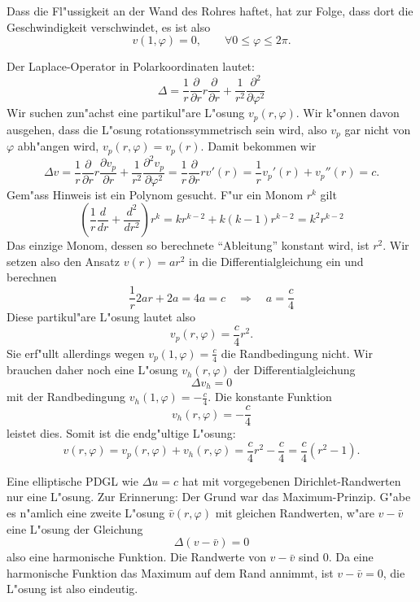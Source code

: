 \begin{loesung}
\begin{teilaufgaben}
\item Dass die Fl"ussigkeit an der Wand des Rohres haftet, hat zur
Folge, dass dort die Geschwindigkeit verschwindet, es ist also
\[
v(1,\varphi)=0,\qquad\forall 0\le \varphi\le 2\pi.
\]
\item Der Laplace-Operator in Polarkoordinaten lautet:
\[
\Delta
=
\frac1r\frac{\partial}{\partial r}r\frac{\partial}{\partial r}
+\frac1{r^2}\frac{\partial^2}{\partial\varphi^2}
\]
Wir suchen zun"achst eine partikul"are L"osung $v_p(r,\varphi)$.
Wir k"onnen davon ausgehen, dass die L"osung rotationssymmetrisch
sein wird, also $v_p$ gar nicht von $\varphi$ abh"angen wird,
$v_p(r,\varphi)=v_p(r)$. Damit bekommen wir
\[
\Delta v=
\frac1r\frac{\partial}{\partial r}r
\frac{\partial v_p}{\partial r}
+\frac1{r^2}\frac{\partial^2v_p}{\partial\varphi^2}
=
\frac1r\frac{\partial}{\partial r}rv'(r)
=
\frac1rv_p'(r)+v_p''(r)=c.
\]
Gem"ass Hinweis ist ein Polynom gesucht. F"ur ein Monom $r^k$
gilt
\[
\left(\frac1r\frac{d}{dr}+\frac{d^2}{dr^2}\right)r^k
=kr^{k-2}+k(k-1)r^{k-2}
=k^2 r^{k-2}
\]
Das einzige Monom, dessen so berechnete ``Ableitung'' konstant wird, ist
$r^2$.
Wir
setzen also den Ansatz $v(r)=ar^2$
in die Differentialgleichung ein und berechnen
\[
\frac1r2ar+2a
=
4a
=c
\quad
\Rightarrow
\quad
a=\frac{c}{4}
\]
Diese partikul"are L"osung lautet also
\[
v_p(r,\varphi)=\frac{c}{4}r^2.
\]
Sie erf"ullt allerdings wegen $v_p(1,\varphi)=\frac{c}{4}$ die
Randbedingung nicht. Wir brauchen daher noch eine
L"osung $v_h(r,\varphi)$ der Differentialgleichung
\[
\Delta v_h=0
\]
mit der Randbedingung $v_h(1,\varphi)=-\frac{c}{4}$. Die konstante
Funktion
\[
v_h(r,\varphi)=-\frac{c}{4}
\]
leistet dies. Somit ist die endg"ultige L"osung:
\[
v(r,\varphi)=v_p(r,\varphi)+v_h(r,\varphi)=\frac{c}{4}r^2 -\frac{c}{4}=
\frac{c}{4}(r^2-1).
\]
\item Eine elliptische PDGL wie $\Delta u=c$ hat mit vorgegebenen
Dirichlet-Randwerten nur eine L"osung. Zur Erinnerung: Der Grund
war das Maximum-Prinzip.
G"abe es n"amlich eine zweite L"osung $\bar v(r,\varphi)$ mit gleichen
Randwerten, w"are
$v-\bar v$ eine L"osung der Gleichung
\[
\Delta (v-\bar v)=0
\]
also eine harmonische Funktion. Die Randwerte von $v-\bar v$ sind $0$.
Da eine harmonische Funktion das Maximum auf dem Rand annimmt, ist
$v-\bar v=0$, die  L"osung ist also eindeutig.
\qedhere
\end{teilaufgaben}
\end{loesung}
